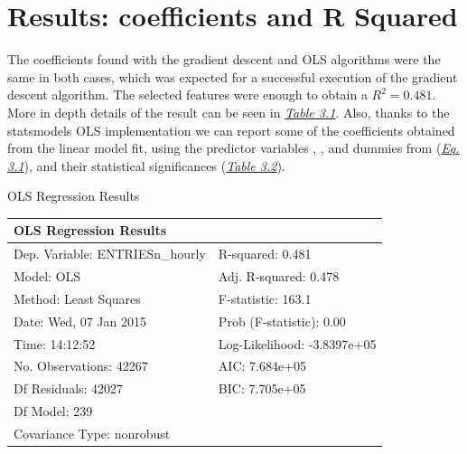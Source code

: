 \documentclass[a4paper,12pt,english]{sphinxmanual}
\begin{document}
\section{Results: coefficients and R Squared}
\label{section2:results-coefficients-and-r-squared}
The coefficients found with the gradient descent and OLS algorithms were the
same in both cases, which was expected for a successful execution of the
gradient descent algorithm. The selected features were enough to obtain a
\(R^2 = 0.481\). More in depth details of the result can be seen in
{\hyperref[section2:table31]{\emph{Table 3.1}}}. Also, thanks to the statsmodels OLS implementation
we can report some of the coefficients obtained from the linear model fit,
using the predictor variables , ,  and dummies from 
({\hyperref[section2:multreg-mod]{\emph{Eq. 3.1}}}), and their statistical significances
({\hyperref[section2:table32]{\emph{Table 3.2}}}).
\label{section2:table31}

\begin{threeparttable}
\capstart\caption{OLS Regression Results}

\begin{tabulary}{\linewidth}{|L|L|}
\hline
\textsf{\relax 
OLS Regression Results
} & \textsf{\relax }\\
\hline
Dep. Variable:        ENTRIESn\_hourly
 & 
R-squared:                       0.481
\\

Model:                            OLS
 & 
Adj. R-squared:                  0.478
\\

Method:                 Least Squares
 & 
F-statistic:                     163.1
\\

Date:                Wed, 07 Jan 2015
 & 
Prob (F-statistic):               0.00
\\

Time:                        14:12:52
 & 
Log-Likelihood:            -3.8397e+05
\\

No. Observations:               42267
 & 
AIC:                         7.684e+05
\\

Df Residuals:                   42027
 & 
BIC:                         7.705e+05
\\

Df Model:                         239
 & \\

Covariance Type:            nonrobust
 & \\
\hline\end{tabulary}

\end{threeparttable}
\end{document}
